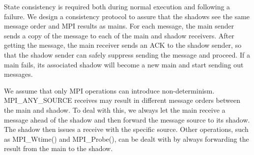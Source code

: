 State consistency is required both during normal execution and following a failure. %
We design a consistency protocol %
to assure 
that the shadows see the same message order and MPI results as mains. %
For each message, the main sender sends a copy of the message to each of the main and shadow receivers. After getting the message, the main receiver sends an ACK to the shadow sender, so that the shadow sender can safely suppress sending the message and proceed. 
If a main fails,
its associated shadow will become a new main and start sending out messages. %


We assume that only MPI operations can introduce non-determinism. MPI\_ANY\_SOURCE receives may result in different message orders between the main and shadow. To deal with this, we always let the main receive a message ahead of the shadow and then forward the message source to its shadow. %
The shadow then issues a receive with the specific source. Other operations, such as MPI\_Wtime() and MPI\_Probe(), can be dealt with by always forwarding the result from the main to the shadow.

